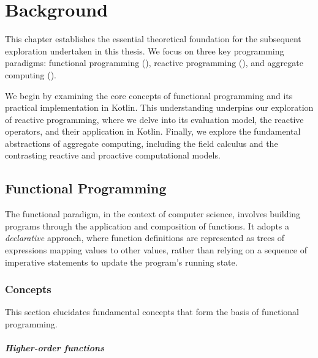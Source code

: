 
\chapter{Background}
\label{chap:background}

This chapter establishes the essential theoretical foundation for the subsequent exploration undertaken in this thesis. We focus on three key programming paradigms: functional programming (), reactive programming (), and aggregate computing ().

We begin by examining the core concepts of functional programming and its practical implementation in Kotlin. This understanding underpins our exploration of reactive programming, where we delve into its evaluation model, the reactive operators, and their application in Kotlin. Finally, we explore the fundamental abstractions of aggregate computing, including the field calculus and the contrasting reactive and proactive computational models.

\section{Functional Programming}
\label{section:functional-programming}

The functional paradigm, in the context of computer science, involves building programs through the application and composition of functions. It adopts a \textit{declarative} approach, where function definitions are represented as trees of expressions mapping values to other values, rather than relying on a sequence of imperative statements to update the program's running state.

\subsection{Concepts}

This section elucidates fundamental concepts that form the basis of functional programming.

\paragraph{Higher-order functions}

